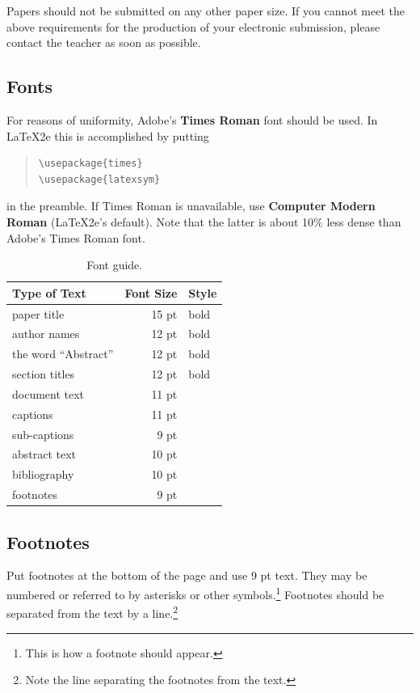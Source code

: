 \documentclass[11pt]{article}
\begin{document}
\noindent Papers should not be submitted on any other paper size.
If you cannot meet the above requirements for
the production of your electronic submission, please contact the
teacher as soon as possible.


\subsection{Fonts}

For reasons of uniformity, Adobe's {\bf Times Roman} font should be
used. In \LaTeX2e{} this is accomplished by putting

\begin{quote}
\begin{verbatim}
\usepackage{times}
\usepackage{latexsym}
\end{verbatim}
\end{quote}
in the preamble. If Times Roman is unavailable, use {\bf Computer
  Modern Roman} (\LaTeX2e{}'s default).  Note that the latter is about
  10\% less dense than Adobe's Times Roman font.

\begin{table}[h]
\caption{\label{table:fonts} Font guide.}
\begin{center}
\begin{tabular}{|l|r|l|}
\hline 
\bf Type of Text & \bf Font Size & \bf Style \\ 
\hline
\hline
paper title & 15 pt & bold \\
author names & 12 pt & bold \\
the word ``Abstract'' & 12 pt & bold \\
section titles & 12 pt & bold \\
document text & 11 pt  &\\
captions & 11 pt & \\
sub-captions & 9 pt & \\
abstract text & 10 pt & \\
bibliography & 10 pt & \\
footnotes & 9 pt & \\
\hline
\end{tabular}
\end{center}
\end{table}

\subsection{Footnotes}

Put footnotes at the bottom of the page and use 9 pt
text. They may be numbered or referred to by asterisks or other
symbols.\footnote{This is how a footnote should appear.} Footnotes
should be separated from the text by a line.\footnote{Note the line
separating the footnotes from the text.}
\end{document}
